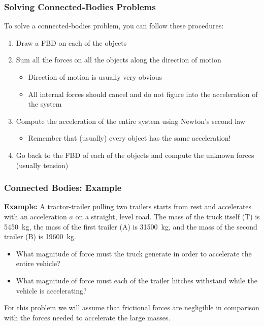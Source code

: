 \documentclass[12pt,compress,aspectratio=169]{beamer}
\begin{document}
\begin{frame}
  \frametitle{Solving Connected-Bodies Problems}
  To solve a connected-bodies problem, you can follow these procedures:
  \begin{enumerate}
  \item Draw a FBD on each of the objects
  \item Sum all the forces on all the objects along the direction of motion
    \begin{itemize}
    \item Direction of motion is usually very obvious
    \item All internal forces should cancel and do not figure into the
      acceleration of the system
    \end{itemize}
  \item Compute the acceleration of the entire system using Newton's second law
    \begin{itemize}
    \item Remember that (usually) every object has the same acceleration!
    \end{itemize}
  \item Go back to the FBD of each of the objects and compute the unknown
    forces (usually tension)
  \end{enumerate}
\end{frame}



\begin{frame}
  \frametitle{Connected Bodies: Example}
  \textbf{Example:} A tractor-trailer pulling two trailers starts from rest
  and accelerates with an acceleration $a$ on a straight, level road.
  The mass of the truck itself (T) is  %
  \SI{5450}{kg}, the
  mass of the first trailer (A) is \SI{31500}{kg}, and the mass of the second
  trailer (B) is \SI{19600}{kg}.
  \begin{itemize}
  \item What magnitude of force must the truck generate in order to accelerate
    the entire vehicle?
  \item What magnitude of force must each of the trailer hitches withstand
    while the vehicle is accelerating?
  \end{itemize}
  For this problem we will assume that frictional forces are negligible in
  comparison with the forces needed to accelerate the large masses.
\end{frame}
\end{document}
